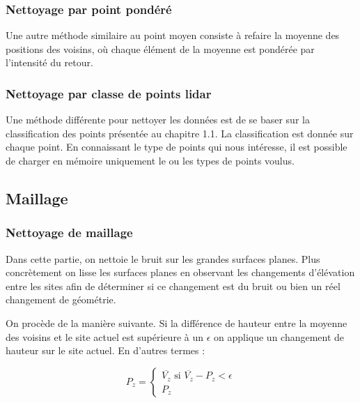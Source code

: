 \subsubsection{Nettoyage par point pondéré}

Une autre méthode similaire au point moyen consiste à refaire la moyenne des
positions des voisins, où chaque élément de la moyenne est pondérée par l'intensité du retour.

\subsubsection{Nettoyage par classe de points lidar}

Une méthode différente pour nettoyer les données est de se baser sur la 
classification des points présentée au chapitre 1.1.
La classification est donnée sur chaque point.
En connaissant le type de points qui nous intéresse, il est possible de charger
en mémoire uniquement le ou les types de points voulus. 

\subsection{Maillage}
\subsubsection{Nettoyage de maillage}

Dans cette partie, on nettoie le bruit sur les grandes surfaces planes.
Plus concrètement on lisse les surfaces planes en observant les changements
d'élévation entre les sites afin de déterminer si ce changement est du bruit ou
bien un réel changement de géométrie.

On procède de la manière suivante. 
Si la différence de hauteur entre la moyenne des voisins et le site actuel est
supérieure à un $\epsilon$ on applique un changement de hauteur sur le site
actuel.
En d'autres termes :

$$
P_z = 
\left \{
	\begin{array}{l}
		\overline{V_z}\text{ si } \overline{V_z} - P_z < \epsilon \\ 
		P_z 
	\end{array}
\right .
$$

